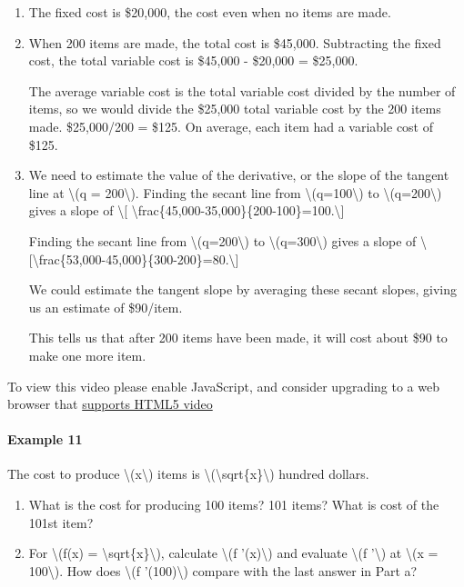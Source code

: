 \begin{enumerate}
\item
  The fixed cost is \$20,000, the cost even when no items are made.
\item
  When 200 items are made, the total cost is \$45,000. Subtracting the
  fixed cost, the total variable cost is \$45,000 - \$20,000 = \$25,000.

  The average variable cost is the total variable cost divided by the
  number of items, so we would divide the \$25,000 total variable cost
  by the 200 items made. \$25,000/200 = \$125. On average, each item had
  a variable cost of \$125.
\item
  We need to estimate the value of the derivative, or the slope of the
  tangent line at \textbackslash{}(q = 200\textbackslash{}). Finding the
  secant line from \textbackslash{}(q=100\textbackslash{}) to
  \textbackslash{}(q=200\textbackslash{}) gives a slope of
  \textbackslash{}{[}
  \textbackslash{}frac\{45,000-35,000\}\{200-100\}=100.\textbackslash{}{]}

  Finding the secant line from \textbackslash{}(q=200\textbackslash{})
  to \textbackslash{}(q=300\textbackslash{}) gives a slope of
  \textbackslash{}{[}\textbackslash{}frac\{53,000-45,000\}\{300-200\}=80.\textbackslash{}{]}

  We could estimate the tangent slope by averaging these secant slopes,
  giving us an estimate of \$90/item.

  This tells us that after 200 items have been made, it will cost about
  \$90 to make one more item.
\end{enumerate}

To view this video please enable JavaScript, and consider upgrading to a
web browser that \href{http://videojs.com/html5-video-support/}{supports
HTML5 video}

\hypertarget{example-11}{%
\paragraph{Example 11}\label{example-11}}

The cost to produce \textbackslash{}(x\textbackslash{}) items is
\textbackslash{}(\textbackslash{}sqrt\{x\}\textbackslash{}) hundred
dollars.

\begin{enumerate}
\tightlist
\item
  What is the cost for producing 100 items? 101 items? What is cost of
  the 101st item?
\item
  For \textbackslash{}(f(x) =
  \textbackslash{}sqrt\{x\}\textbackslash{}), calculate
  \textbackslash{}(f '(x)\textbackslash{}) and evaluate
  \textbackslash{}(f '\textbackslash{}) at \textbackslash{}(x =
  100\textbackslash{}). How does \textbackslash{}(f
  '(100)\textbackslash{}) compare with the last answer in Part a?
\end{enumerate}

